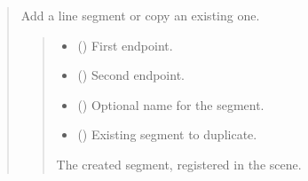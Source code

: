 \documentclass[letterpaper,10pt,english]{sphinxmanual}
\begin{document}
\begin{quote}
\begin{fulllineitems}

\begin{fulllineitems}
\label{\detokenize{pygeox:pygeox.add_objects.AddNamespace.line_segment}}
\pysigstartsignatures
\pysiglinewithargsret
{}
{\sphinxparamcomma {}\sphinxparamcomma {}\sphinxparamcomma {}}
{}
\pysigstopsignatures
\sphinxAtStartPar
Add a line segment or copy an existing one.
\begin{quote}\begin{description}
\begin{itemize}
\item {} 
\sphinxAtStartPar
{} (\sphinxstyleliteralemphasis{\sphinxupquote{ | }}) \textendash{} First endpoint.

\item {} 
\sphinxAtStartPar
{} (\sphinxstyleliteralemphasis{\sphinxupquote{ | }}) \textendash{} Second endpoint.

\item {} 
\sphinxAtStartPar
{} (\sphinxstyleliteralemphasis{\sphinxupquote{ | }}) \textendash{} Optional name for the segment.

\item {} 
\sphinxAtStartPar
{} (\sphinxstyleliteralemphasis{\sphinxupquote{ | }}) \textendash{} Existing segment to duplicate.

\end{itemize}

\sphinxAtStartPar
The created segment, registered in the scene.


\end{description}
\end{quote}
\end{fulllineitems}
\end{fulllineitems}
\end{quote}
\end{document}
